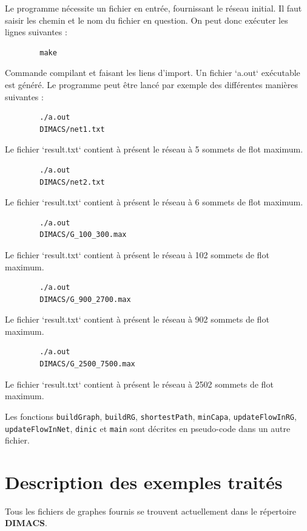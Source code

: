 \documentclass[11pt, a4paper]{report}
\begin{document}
	Le programme nécessite un fichier en entrée, fournissant le réseau initial. Il faut saisir les chemin et le nom du fichier en question. On peut donc exécuter les lignes suivantes :
	\lstset{language=bash}
	\begin{lstlisting}
		make
	\end{lstlisting}
	Commande compilant et faisant les liens d'import. Un fichier `a.out` exécutable est généré. Le programme peut être lancé par exemple des différentes manières suivantes :
	
	\begin{lstlisting}
		./a.out
		DIMACS/net1.txt
	\end{lstlisting}
	Le fichier `result.txt` contient à présent le réseau à 5 sommets de flot maximum.
	
	\begin{lstlisting}
		./a.out
		DIMACS/net2.txt
	\end{lstlisting}
	Le fichier `result.txt` contient à présent le réseau à 6 sommets de flot maximum.
	
	\begin{lstlisting}
		./a.out
		DIMACS/G_100_300.max
	\end{lstlisting}
	Le fichier `result.txt` contient à présent le réseau à 102 sommets de flot maximum.
	
	\begin{lstlisting}
		./a.out
		DIMACS/G_900_2700.max
	\end{lstlisting}
	Le fichier `result.txt` contient à présent le réseau à 902 sommets de flot maximum.
	
	\begin{lstlisting}
		./a.out
		DIMACS/G_2500_7500.max
	\end{lstlisting}
	Le fichier `result.txt` contient à présent le réseau à 2502 sommets de flot maximum.
	
	Les fonctions \verb|buildGraph|, \verb|buildRG|, \verb|shortestPath|, \verb|minCapa|, \verb|updateFlowInRG|, \verb|updateFlowInNet|, \verb|dinic| et \verb|main| sont décrites en pseudo-code dans un autre fichier.
	
	
	
	
	\chapter{Description des exemples traités}
	
	Tous les fichiers de graphes fournis se trouvent actuellement dans le répertoire \textbf{DIMACS}.
	
\end{document}
